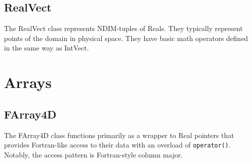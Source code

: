 \documentclass[letterpaper,12pt]{article}
\begin{document}
\subsection{RealVect}

The RealVect class represents NDIM-tuples of Reals. They typically represent points of the domain in physical space. They have basic math operators defined in the same way as IntVect.

\section{Arrays}
\subsection*{FArray4D}

The FArray4D class functions primarily as a wrapper to Real pointers that provides Fortran-like access to their data with an overload of \texttt{operator()}. Notably, the access pattern is Fortran-style column major.
\end{document}
